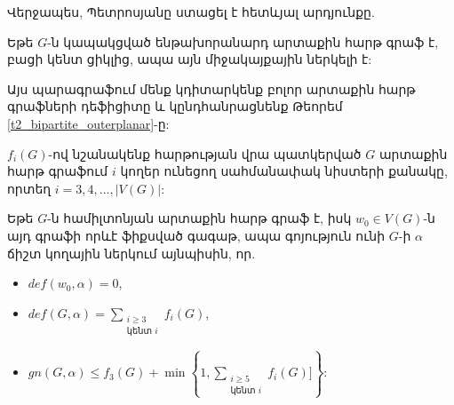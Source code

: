 Վերջապես, Պետրոսյանը \cite{Petrosyan2013Outerplanar} ստացել է հետևյալ արդյունքը.
\begin{theorem}
Եթե $G$-ն կապակցված ենթախորանարդ արտաքին հարթ գրաֆ է, բացի կենտ ցիկլից, ապա այն միջակայքային ներկելի է:
\end{theorem}

Այս պարագրաֆում մենք կդիտարկենք բոլոր արտաքին հարթ գրաֆների դեֆիցիտը և կընդհանրացնենք Թեորեմ  \ref{t2_bipartite_outerplanar}-ը:

$f_i(G)$-ով նշանակենք հարթության վրա պատկերված $G$ արտաքին հարթ գրաֆում $i$ կողեր ունեցող սահմանափակ նիստերի քանակը, որտեղ $i=3,4,\ldots,|V(G)|$:

\begin{lemma}
\label{outerplanar_basic_2connected}
Եթե $G$-ն համիլտոնյան արտաքին հարթ գրաֆ է, իսկ $w_0 \in V(G)$-ն այդ գրաֆի որևէ ֆիքսված գագաթ, ապա գոյություն ունի $G$-ի $\alpha$ ճիշտ կողային ներկում այնպիսին, որ.
\begin{itemize}
\item $def(w_0,\alpha)=0$,
\item $def(G,\alpha)=\sum\limits_{\substack{i\geq 3 \\ \text{կենտ }i}}{f_i(G)}$,
\item $gn(G,\alpha) \leq f_3(G) + \min\left\{1, \sum\limits_{\substack{i\geq 5 \\ \text{կենտ }i}}{f_{i}(G)}]\right\}$:
\end{itemize}
\end{lemma}
